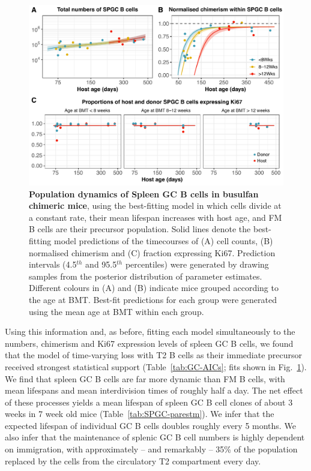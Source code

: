 \documentclass[12pt]{article}
\newcommand{\looic}{$\Delta$LOO-IC}
\begin{document}
	\begin{figure}[htbp]
		\centerline{\includegraphics[scale = 0.85] {Results_SPGC_T2.pdf}}
		\caption{\textbf{Population dynamics of Spleen GC B cells in busulfan chimeric mice}, using the best-fitting model in which  cells divide at a constant rate, their mean lifespan increases with host age, and FM B cells are their precursor population. %
Solid lines denote the  best-fitting model predictions of the  timecourses  of (A) cell counts, (B) normalised chimerism and (C)  fraction expressing Ki67. Prediction intervals (4.5$^{th}$ and 95.5$^{th}$ percentiles) were generated by drawing samples from the posterior distribution of parameter estimates. Different colours in (A) and (B) indicate mice grouped according to the age at BMT. Best-fit predictions for each group were generated using the mean age at BMT within each group.}
		\label{fig:results_SPGC}
	\end{figure}
    
    
Using this information and, as before, fitting each model simultaneously to the numbers, chimerism and Ki67 expression levels of spleen GC B cells, we found that the model of time-varying loss with T2 B cells as their immediate precursor received strongest statistical support (Table~\ref{tab:GC-AICs}; fits shown in Fig.~\ref{fig:results_SPGC}).  We find that spleen GC B cells are far more dynamic than FM B cells,  with mean lifespans and mean interdivision times of roughly half a day. The net effect of these processes yields a mean lifespan of spleen GC B cell clones of about 3 weeks in 7 week old mice (Table~\ref{tab:SPGC-parestm}). We infer that the expected lifespan of individual GC B cells doubles roughly every 5 months.
	We also infer that the maintenance of splenic GC B cell numbers is highly dependent on immigration, with approximately -- and remarkably --  35\% of the population replaced by the cells from the circulatory T2 compartment every day.
	
\end{document}
